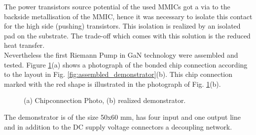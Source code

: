 \documentclass[journal]{IEEEtran}
\begin{document}
The power transistors source potential of the used MMICs got a via to the backside metallisation of the MMIC, hence it was necessary to isolate this contact for the high side (pushing) transistors.
This isolation is realized by an isolated pad on the substrate.
The trade-off which comes with this solution is the reduced heat transfer.\\
Nevertheless the first Riemann Pump in GaN technology were assembled and tested.
Figure \ref{fig:photo_chipconnection_demonstrator}(a) shows a photograph of the bonded chip connection according to the layout in Fig. \ref{fig:assembled_demonstrator}(b).
This chip connection marked with the red shape is illustrated in the photograph of Fig. \ref{fig:photo_chipconnection_demonstrator}(b).
\begin{figure}[htb]
  \centering
	\begin{scriptsize}
  	\def\svgwidth{\columnwidth}
 	 
  	\caption{(a) Chipconnection Photo, (b) realized demonstrator.}
  	\label{fig:photo_chipconnection_demonstrator}
	\end{scriptsize}
\end{figure}
The demonstrator is of the size 50x60 mm, has four input and one output line and in addition to the DC supply voltage connectors a decoupling network.
%
\end{document}
